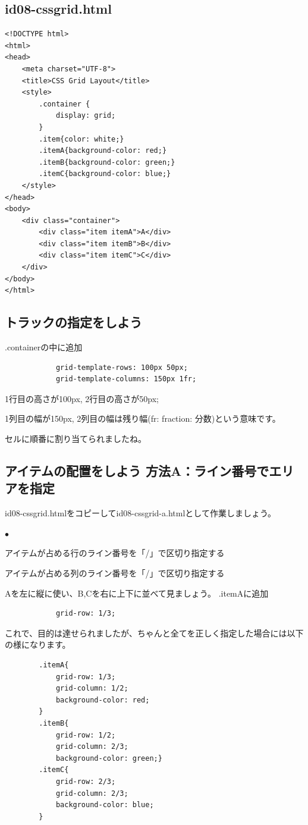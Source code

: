 \documentclass[mingoth,11pt,a4j,uplatex,dvipdfmx]{jsarticle}
\renewenvironment{description}%
{%
   \begin{list}{\parbox{1zw}{$\bullet$}}%
   {%
      \setlength{\topsep}{1zh}
      \setlength{\itemindent}{3zw}
      \setlength{\leftmargin}{5zw}%
      \setlength{\rightmargin}{0zw}%
      \setlength{\labelsep}{1zw}%
      \setlength{\labelwidth}{3zw}%
      \setlength{\itemsep}{0em}%
      \setlength{\parsep}{0em}%
      \setlength{\listparindent}{0zw}%
   }
}{%
   \end{list}%
}
\begin{document}
\subsection{id08-cssgrid.html}
\begin{lstlisting}
<!DOCTYPE html>
<html>
<head>
    <meta charset="UTF-8">
    <title>CSS Grid Layout</title>
    <style>
        .container {
            display: grid;
        }
        .item{color: white;}
        .itemA{background-color: red;}
        .itemB{background-color: green;}
        .itemC{background-color: blue;}
    </style>
</head>
<body>
    <div class="container">
        <div class="item itemA">A</div>
        <div class="item itemB">B</div>
        <div class="item itemC">C</div>
    </div>
</body>
</html>
\end{lstlisting}

\subsection{トラックの指定をしよう}
.containerの中に追加
\begin{lstlisting}
            grid-template-rows: 100px 50px;
            grid-template-columns: 150px 1fr;
\end{lstlisting}
1行目の高さが100px, 2行目の高さが50px;

1列目の幅が150px, 2列目の幅は残り幅(fr: fraction: 分数)という意味です。

セルに順番に割り当てられましたね。

\subsection{アイテムの配置をしよう 方法A：ライン番号でエリアを指定}
id08-cssgrid.htmlをコピーしてid08-cssgrid-a.htmlとして作業しましょう。
\begin{description}
\item[gird-row] アイテムが占める行のライン番号を「/」で区切り指定する
\item[grid-column] アイテムが占める列のライン番号を「/」で区切り指定する
\end{description}
Aを左に縦に使い、B,Cを右に上下に並べて見ましょう。
.itemAに追加
\begin{lstlisting}
            grid-row: 1/3;
\end{lstlisting}

これで、目的は達せられましたが、ちゃんと全てを正しく指定した場合には以下の様になります。

\begin{lstlisting}
        .itemA{
            grid-row: 1/3;
            grid-column: 1/2;
            background-color: red;
        }
        .itemB{
            grid-row: 1/2;
            grid-column: 2/3;
            background-color: green;}
        .itemC{
            grid-row: 2/3;
            grid-column: 2/3;
            background-color: blue;
        }
\end{lstlisting}
\end{document}

